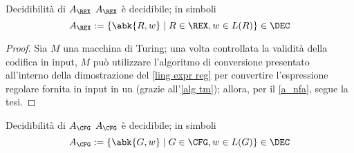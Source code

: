 \documentclass[a4paper, 12pt]{report}
\begin{document}
    \begin{framedthm}{Decidibilità di $A_\REX$}
        $A_\REX$ è decidibile; in simboli $$A_\REX := \{\abk{R, w} \mid R \in \REX, w \in L(R)\} \in \DEC$$
    \end{framedthm}

    \begin{proof}
        Sia $M$ una macchina di Turing; una volta controllata la validità della codifica in input, $M$ può utilizzare l'algoritmo di conversione presentato all'interno della dimostrazione del \cref{ling expr reg} per convertire l'espressione regolare fornita in input in un \NFA (grazie all'\cref{alg tm}); allora, per il \cref{a_nfa}, segue la tesi.
    \end{proof}

    \begin{framedthm}[label={a_cfg in dec}]{Decidibilità di $A_\CFG$}
        $A_\CFG$ è decidibile; in simboli $$A_\CFG := \{\abk{G, w} \mid G \in \CFG, w \in L(G)\} \in \DEC$$
    \end{framedthm}
\end{document}
